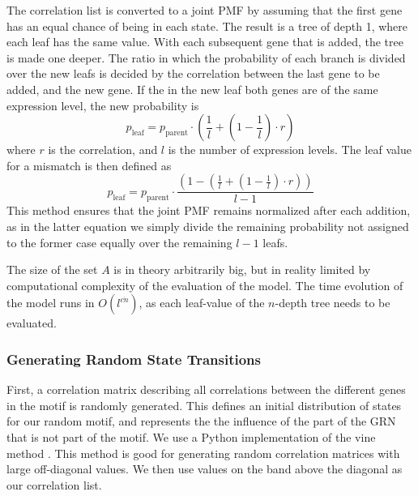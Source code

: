 \documentclass[../main.tex]{subfiles}
\begin{document}
The correlation list is converted to a joint PMF by assuming that the first gene has an equal chance of being in each state.
The result is a tree of depth 1, where each leaf has the same value.
With each subsequent gene that is added, the tree is made one deeper.
The ratio in which the probability of each branch is divided over the new leafs is decided by the correlation between the last gene to be added, and the new gene.
If the in the new leaf both genes are of the same expression level, the new probability is
%
\begin{equation}
    p_\mathrm{leaf} = p_\mathrm{parent} \cdot (\frac{1}{l} + (1 - \frac{1}{l}) \cdot r)
\end{equation}
%
where $r$ is the correlation, and $l$ is the number of expression levels.
The leaf value for a mismatch is then defined as
%
\begin{equation}
    p_\mathrm{leaf} = p_\mathrm{parent} \cdot \frac{(1 - (\frac{1}{l} + (1 - \frac{1}{l}) \cdot r))}{l-1} 
\end{equation}
%
This method ensures that the joint PMF remains normalized after each addition, as in the latter equation we simply divide the remaining probability not assigned to the former case equally over the remaining $l-1$ leafs.

The size of the set $A$ is in theory arbitrarily big, but in reality limited by computational complexity of the evaluation of the model. 
The time evolution of the model runs in $O(l^{c \dot n})$, as each leaf-value of the $n$-depth tree needs to be evaluated. 

\subsubsection{Generating Random State Transitions}

First, a correlation matrix describing all correlations between the different genes in the motif is randomly generated.
This defines an initial distribution of states for our random motif, and represents the the influence of the part of the GRN that is not part of the motif.
We use a Python implementation of the vine method \cite{lewandowski2009generating}.
This method is good for generating random correlation matrices with large off-diagonal values.
We then use values on the band above the diagonal as our correlation list.
\end{document}
